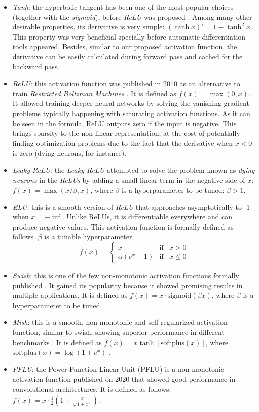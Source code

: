 \begin{itemize}
	\item \textit{Tanh}: the hyperbolic tangent has been one of the most popular choices (together with the \textit{sigmoid}), before \textit{ReLU} was proposed \autocite{lecun2012}. Among many other desirable properties, its derivative is very simple: $(\tanh x)'=1-\tanh^2 x$. This property was very beneficial specially before automatic differentiation tools appeared. Besides, similar to our proposed activation function, the derivative can be easily calculated during forward pass and cached for the backward pass.
	\item \textit{ReLU}: this activation function was published in 2010 as an alternative to train \textit{Restricted Boltzman Machines} \autocite{nair2010}. It is defined as $f(x) = \max(0,x)$. It allowed training deeper neural networks by solving the vanishing gradient problems typically happening with saturating activation functions. As it can be seen in the formula, ReLU outputs zero if the input is negative. This brings sparsity to the non-linear representation, at the cost of potentially finding optimization problems due to the fact that the derivative when $x<0$ is zero (dying neurons, for instance).
	\item \textit{Leaky-ReLU}: the \textit{Leaky-ReLU} \autocite{xu2015} attempted to solve the problem known as \textit{dying neurons} in the \textit{ReLUs} by adding a small linear term in the negative side of $x$: $f(x) = \max(x/\beta, x)$, where $\beta$ is a hyperparameter to be tuned: $\beta>1$.
	\item \textit{ELU}: this is a smooth version of \textit{ReLU} \autocite{djork2016} that approaches asymptotically to -1 when $x=-\inf$. Unlike ReLUs, it is differentiable everywhere and can produce negative values. This activation function is formally defined as follows. $\beta$ is a tunable hyperparameter.
	$$
	f(x)= \left\{ \begin{array}{lcc}
		x &   \text{if}  & x > 0 \\
 \alpha(e^x - 1) &  \text{if} & x \leq 0
	\end{array}
	\right.
	$$

	\item \textit{Swish}: this is one of the few non-monotonic activation functions formally published \autocite{ramachandran2018}. It gained its popularity because it showed promising results in multiple applications. It is defined as $f(x) = x \cdot \text{sigmoid}(\beta x)$, where $\beta$ is a hyperparameter to be tuned.
	\item \textit{Mish}: this is a smooth, non-monotonic and self-regularized activation function, similar to swish, showing superior performance in different benchmarks \autocite{misra2019mish}. It is defined as $f(x) = x \tanh \left[\text{softplus} (x)\right]$, where $\text{softplus} (x) = \log(1+e^x)$ \autocite{dugas2001}.
	\item \textit{PFLU}: the Power Function Linear Unit (PFLU) is a non-monotonic activation function published on 2020 that showed good performance in convolutional architectures. It is defined as follows: $f(x) = x \cdot \frac{1}{2} \left( 1 + \frac{x}{\sqrt{1+x^2}} \right)$.


\end{itemize}

